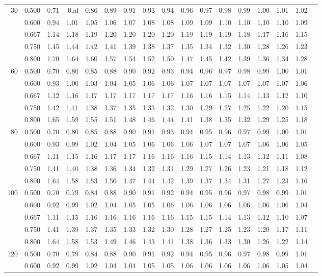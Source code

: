 {\begin{center}
\begin{tabular}{rrr@{\,}r@{\,}r@{\,}r@{\,}r@{\,}r@{\,}r@{\,}r
                   @{\,}r@{\,}r@{\,}r@{\,}r@{\,}r@{\,}r@{\,}r}
30&0.500&0.71&0.al&0.86&0.89&0.91&0.93&0.94&0.96&0.97&0.98&0.99&1.00&1.01&1.02\\
  &0.600&0.94&1.01&1.05&1.06&1.07&1.08&1.08&1.09&1.09&1.10&1.10&1.10&1.10&1.09\\
  &0.667&1.14&1.18&1.19&1.20&1.20&1.20&1.20&1.19&1.19&1.19&1.18&1.17&1.16&1.15\\
  &0.750&1.45&1.44&1.42&1.41&1.39&1.38&1.37&1.35&1.34&1.32&1.30&1.28&1.26&1.23\\
  &0.800&1.70&1.64&1.60&1.57&1.54&1.52&1.50&1.47&1.45&1.42&1.39&1.36&1.34&1.28\\
60&0.500&0.70&0.80&0.85&0.88&0.90&0.92&0.93&0.94&0.96&0.97&0.98&0.99&1.00&1.01\\
  &0.600&0.93&1.00&1.03&1.04&1.05&1.06&1.06&1.07&1.07&1.07&1.07&1.07&1.07&1.06\\
  &0.667&1.12&1.16&1.17&1.17&1.17&1.17&1.17&1.16&1.16&1.15&1.14&1.13&1.12&1.10\\
  &0.750&1.42&1.41&1.38&1.37&1.35&1.33&1.32&1.30&1.29&1.27&1.25&1.22&1.20&1.15\\
  &0.800&1.65&1.59&1.55&1.51&1.48&1.46&1.44&1.41&1.38&1.35&1.32&1.29&1.25&1.18\\
  80&0.500&0.70&0.80&0.85&0.88&0.90&0.91&0.93&0.94&0.95&0.96&0.97&0.99&1.00&1.01\\
  &0.600&0.93&0.99&1.02&1.04&1.05&1.06&1.06&1.06&1.07&1.07&1.07&1.06&1.06&1.05\\
  &0.667&1.11&1.15&1.16&1.17&1.17&1.16&1.16&1.16&1.15&1.14&1.13&1.12&1.11&1.08\\
  &0.750&1.41&1.40&1.38&1.36&1.34&1.32&1.31&1.29&1.27&1.26&1.23&1.21&1.18&1.12\\
  &0.800&1.64&1.58&1.53&1.50&1.47&1.44&1.42&1.39&1.37&1.34&1.31&1.27&1.23&1.16\\
100
  &0.500&0.70&0.79&0.84&0.88&0.90&0.91&0.92&0.94&0.95&0.96&0.97&0.98&0.99&1.01\\
  &0.600&0.92&0.99&1.02&1.04&1.05&1.05&1.06&1.06&1.06&1.06&1.06&1.06&1.06&1.04\\
  &0.667&1.11&1.15&1.16&1.16&1.16&1.16&1.16&1.15&1.15&1.14&1.13&1.12&1.10&1.07\\
  &0.750&1.41&1.39&1.37&1.35&1.33&1.32&1.30&1.28&1.27&1.25&1.23&1.20&1.17&1.11\\
  &0.800&1.64&1.58&1.53&1.49&1.46&1.43&1.41&1.38&1.36&1.33&1.30&1.26&1.22&1.14\\
120
  &0.500&0.70&0.79&0.84&0.88&0.90&0.91&0.92&0.94&0.95&0.96&0.97&0.98&0.99&1.01\\
  &0.600&0.92&0.99&1.02&1.04&1.04&1.05&1.05&1.06&1.06&1.06&1.06&1.06&1.05&1.04\\

\end{tabular}
\end{center}}
